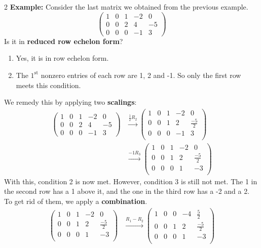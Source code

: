 \documentclass[12pt]{article}
\begin{document}
\begin{multicols}{2}
\textbf{Example:}
  Consider the last matrix we obtained from the previous example.
  \[\begin{pmatrix}
    1&0&1&-2&0\\ 0&0&2&4&-5\\ 0&0&0&-1&3
  \end{pmatrix}\]
  Is it in \textbf{reduced row echelon form}?
  \begin{enumerate}
    \item[C1] Yes, it is in row echelon form.
    \item[C2] The \(1^{\text{st}}\) nonzero entries of each row are 1, 2 and -1. So only the first row meets this condition.
  \end{enumerate}
  We remedy this by applying two \textbf{scalings}:
  \begin{align*}
    \begin{pmatrix}
      1&0&1&-2&0\\ 0&0&2&4&-5\\ 0&0&0&-1&3
    \end{pmatrix}&\xrightarrow{\frac12 R_2}\begin{pmatrix}
      1&0&1&-2&0\\ 0&0&1&2&\frac{-5}{2}\\ 0&0&0&-1&3\\
    \end{pmatrix}\\
      &\xrightarrow{-1 R_3}\begin{pmatrix}
        1&0&1&-2&0\\ 0&0&1&2&\frac{-5}{2}\\ 0&0&0&1&-3\\
    \end{pmatrix}
  \end{align*}
  \vfill\null\columnbreak
  With this, condition 2 is now met. However, condition 3 is still not met. The 1 in the second row has a 1 above it, and the one in the third row has a -2 and a 2. To get rid of them, we apply a \textbf{combination}.
  \begin{align*}
    \begin{pmatrix}
        1&0&1&-2&0\\ 0&0&1&2&\frac{-5}{2}\\ 0&0&0&1&-3\\
    \end{pmatrix}&\xrightarrow{R_1-R_2} \begin{pmatrix}
      1&0&0&-4&\frac{5}{2}\\ 0&0&1&2&\frac{-5}{2}\\ 0&0&0&1&-3\\

\end{pmatrix}
\end{align*}
\end{multicols}
\end{document}
